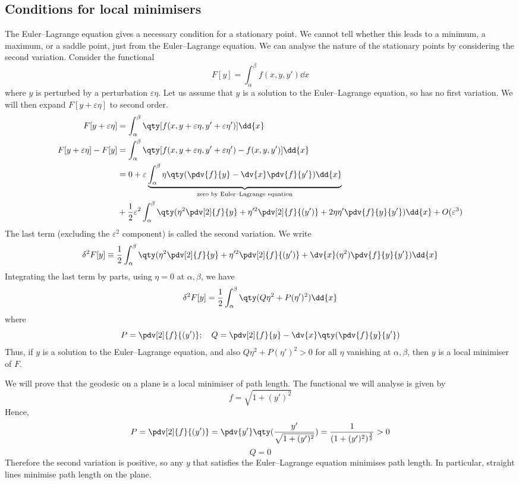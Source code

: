 \subsection{Conditions for local minimisers}
The Euler--Lagrange equation gives a necessary condition for a stationary point.
We cannot tell whether this leads to a minimum, a maximum, or a saddle point, just from the Euler--Lagrange equation.
We can analyse the nature of the stationary points by considering the second variation.
Consider the functional
\[
	F[y] = \int_\alpha^\beta f(x,y,y') \dd{x}
\]
where \( y \) is perturbed by a perturbation \( \varepsilon\eta \).
Let us assume that \( y \) is a solution to the Euler--Lagrange equation, so has no first variation.
We will then expand \( F[y+\varepsilon\eta] \) to second order.
\begin{align*}
	F[y+\varepsilon\eta]        & = \int_\alpha^\beta \qty[f(x,y+\varepsilon\eta,y'+\varepsilon\eta')] \dd{x}                                                                                  \\
	F[y+\varepsilon\eta] - F[y] & = \int_\alpha^\beta \qty[f(x,y+\varepsilon\eta,y'+\varepsilon\eta') - f(x,y,y')] \dd{x}                                                                      \\
	                            & = 0 + \varepsilon \underbrace{\int_\alpha^\beta \eta \qty( \pdv{f}{y} - \dv{x} \pdv{f}{y'} ) \dd{x}}_{\text{zero by Euler--Lagrange equation}}                \\
	                            & + \frac{1}{2} \varepsilon^2 \int_\alpha^\beta  \qty( \eta^2 \pdv[2]{f}{y} + \eta'^2 \pdv[2]{f}{(y')} + 2\eta\eta' \pdv{f}{y}{y'} ) \dd{x} + O(\varepsilon^3)
\end{align*}
The last term (excluding the \( \varepsilon^2 \) component) is called the second variation.
We write
\[
	\delta^2 F[y] \equiv \frac{1}{2}\int_\alpha^\beta \qty( \eta^2 \pdv[2]{f}{y} + \eta'^2 \pdv[2]{f}{(y')} + \dv{x} (\eta^2) \pdv{f}{y}{y'} ) \dd{x}
\]
Integrating the last term by parts, using \( \eta = 0 \) at \( \alpha, \beta \), we have
\[
	\delta^2 F[y] = \frac{1}{2}\int_\alpha^\beta \qty( Q\eta^2 + P(\eta')^2 ) \dd{x}
\]
where
\[
	P = \pdv[2]{f}{(y')};\quad Q = \pdv[2]{f}{y} - \dv{x} \qty(\pdv{f}{y}{y'})
\]
Thus, if \( y \) is a solution to the Euler--Lagrange equation, and also \( Q\eta^2 + P(\eta')^2 > 0 \) for all \( \eta \) vanishing at \( \alpha, \beta \), then \( y \) is a local minimiser of \( F \).

\begin{example}
	We will prove that the geodesic on a plane is a local minimiser of path length.
	The functional we will analyse is given by
	\[
		f = \sqrt{1 + (y')^2}
	\]
	Hence,
	\[
		P = \pdv[2]{f}{(y')} = \pdv{y'} \qty(\frac{y'}{\sqrt{1+(y')^2}}) = \frac{1}{(1+(y')^2)^{\frac{3}{2}}} > 0
	\]
	\[
		Q = 0
	\]
	Therefore the second variation is positive, so any \( y \) that satisfies the Euler--Lagrange equation minimises path length.
	In particular, straight lines minimise path length on the plane.
\end{example}

